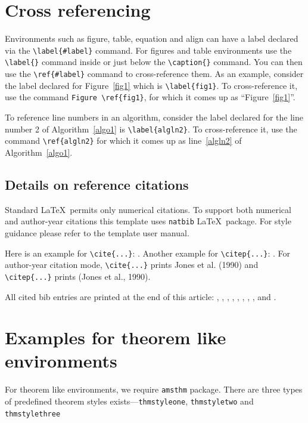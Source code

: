 \documentclass[sn-mathphys]{sn-jnl}%
\begin{document}
\section{Cross referencing}\label{sec8}

Environments such as figure, table, equation and align can have a label
declared via the \verb+\label{#label}+ command. For figures and table
environments use the \verb+\label{}+ command inside or just
below the \verb+\caption{}+ command. You can then use the
\verb+\ref{#label}+ command to cross-reference them. As an example, consider
the label declared for Figure~\ref{fig1} which is
\verb+\label{fig1}+. To cross-reference it, use the command 
\verb+Figure \ref{fig1}+, for which it comes up as
``Figure~\ref{fig1}''. 

To reference line numbers in an algorithm, consider the label declared for the line number 2 of Algorithm~\ref{algo1} is \verb+\label{algln2}+. To cross-reference it, use the command \verb+\ref{algln2}+ for which it comes up as line~\ref{algln2} of Algorithm~\ref{algo1}.

\subsection{Details on reference citations}\label{subsec7}

Standard \LaTeX\ permits only numerical citations. To support both numerical and author-year citations this template uses \verb+natbib+ \LaTeX\ package. For style guidance please refer to the template user manual.

Here is an example for \verb+\cite{...}+: \cite{bib1}. Another example for \verb+\citep{...}+: \citep{bib2}. For author-year citation mode, \verb+\cite{...}+ prints Jones et al. (1990) and \verb+\citep{...}+ prints (Jones et al., 1990).

All cited bib entries are printed at the end of this article: \cite{bib3}, \cite{bib4}, \cite{bib5}, \cite{bib6}, \cite{bib7}, \cite{bib8}, \cite{bib9}, \cite{bib10}, \cite{bib11} and \cite{bib12}.

\section{Examples for theorem like environments}\label{sec10}

For theorem like environments, we require \verb+amsthm+ package. There are three types of predefined theorem styles exists---\verb+thmstyleone+, \verb+thmstyletwo+ and \verb+thmstylethree+ 
\end{document}
